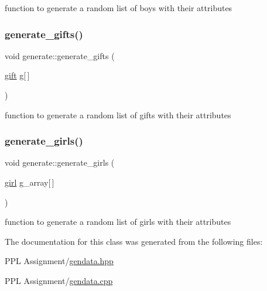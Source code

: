 function to generate a random list of boys with their attributes \mbox{\label{classgenerate_a7ad6fdb15dc8952997dd9bca935201b0}} 
\subsubsection{\texorpdfstring{generate\+\_\+gifts()}{generate\_gifts()}}
{\footnotesize\ttfamily void generate\+::generate\+\_\+gifts (\begin{DoxyParamCaption}\item[{\hyperlink{classgift}{gift}}]{g\mbox{[}$\,$\mbox{]} }\end{DoxyParamCaption})}

function to generate a random list of gifts with their attributes \mbox{\label{classgenerate_a86f4b6e0d8f4bb05f2b83726d747004c}} 
\subsubsection{\texorpdfstring{generate\+\_\+girls()}{generate\_girls()}}
{\footnotesize\ttfamily void generate\+::generate\+\_\+girls (\begin{DoxyParamCaption}\item[{\hyperlink{classgirl}{girl}}]{g\+\_\+array\mbox{[}$\,$\mbox{]} }\end{DoxyParamCaption})}

function to generate a random list of girls with their attributes 

The documentation for this class was generated from the following files\+:\begin{DoxyCompactItemize}
\item 
P\+P\+L Assignment/\hyperlink{gendata_8hpp}{gendata.\+hpp}\item 
P\+P\+L Assignment/\hyperlink{gendata_8cpp}{gendata.\+cpp}\end{DoxyCompactItemize}
